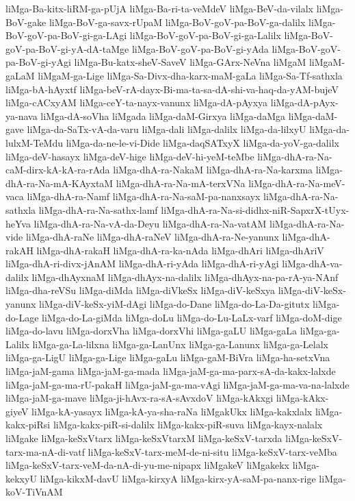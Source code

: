 {liMga-Ba-kitx-liRM-ga-pUjA
liMga-Ba-ri-ta-veMdeV
liMga-BeV-da-vilalx
liMga-BoV-gake
liMga-BoV-ga-savx-rUpaM
liMga-BoV-goV-pa-BoV-ga-dalilx
liMga-BoV-goV-pa-BoV-gi-ga-LAgi
liMga-BoV-goV-pa-BoV-gi-ga-Lalilx
liMga-BoV-goV-pa-BoV-gi-yA-dA-taMge
liMga-BoV-goV-pa-BoV-gi-yAda
liMga-BoV-goV-pa-BoV-gi-yAgi
liMga-Bu-katx-sheV-SaveV
liMga-GArx-NeVna
liMgaM
liMgaM-gaLaM
liMgaM-ga-Lige
liMga-Sa-Divx-dha-karx-maM-gaLa
liMga-Sa-Tf-sathxla
liMga-bA-hAyxtf
liMga-beV-rA-dayx-Bi-ma-ta-sa-dA-shi-va-haq-da-yAM-bujeV
liMga-cACxyAM
liMga-ceY-ta-nayx-vanunx
liMga-dA-pAyxya
liMga-dA-pAyx-ya-nava
liMga-dA-soVha
liMgada
liMga-daM-Girxya
liMga-daMga
liMga-daM-gave
liMga-da-SaTx-vA-da-varu
liMga-dali
liMga-dalilx
liMga-da-lilxyU
liMga-da-lulxM-TeMdu
liMga-da-ne-le-vi-Dide
liMga-daqSATxyX
liMga-da-yoV-ga-dalilx
liMga-deV-hasayx
liMga-deV-hige
liMga-deV-hi-yeM-teMbe
liMga-dhA-ra-Na-caM-dirx-kA-kA-ra-rAda
liMga-dhA-ra-NakaM
liMga-dhA-ra-Na-karxma
liMga-dhA-ra-Na-mA-KAyxtaM
liMga-dhA-ra-Na-mA-terxVNa
liMga-dhA-ra-Na-meV-vaca
liMga-dhA-ra-Namf
liMga-dhA-ra-Na-saM-pa-nanxsayx
liMga-dhA-ra-Na-sathxla
liMga-dhA-ra-Na-sathx-lamf
liMga-dhA-ra-Na-si-didhx-niR-SapxrX-tUyx-heYva
liMga-dhA-ra-Na-vA-da-Deyu
liMga-dhA-ra-Na-vatAM
liMga-dhA-ra-Na-vide
liMga-dhA-raNe
liMga-dhA-raNeV
liMga-dhA-ra-Ne-yanunx
liMga-dhA-rakAH
liMga-dhA-rakaH
liMga-dhA-ra-ka-nAda
liMga-dhAri
liMga-dhAriV
liMga-dhA-ri-divx-jAnAM
liMga-dhA-ri-yAda
liMga-dhA-ri-yAgi
liMga-dhA-va-dalilx
liMga-dhAyxnaM
liMga-dhAyx-na-dalilx
liMga-dhAyx-na-pa-rA-ya-NAnf
liMga-dha-reVSu
liMga-diMda
liMga-diVkeSx
liMga-diV-keSxya
liMga-diV-keSx-yanunx
liMga-diV-keSx-yiM-dAgi
liMga-do-Dane
liMga-do-La-Da-gitutx
liMga-do-Lage
liMga-do-La-giMda
liMga-doLu
liMga-do-Lu-LaLx-varf
liMga-doM-dige
liMga-do-lavu
liMga-dorxVha
liMga-dorxVhi
liMga-gaLU
liMga-gaLa
liMga-ga-Lalilx
liMga-ga-La-lilxna
liMga-ga-LanUnx
liMga-ga-Lanunx
liMga-ga-Lelalx
liMga-ga-LigU
liMga-ga-Lige
liMga-gaLu
liMga-gaM-BiVra
liMga-ha-setxVna
liMga-jaM-gama
liMga-jaM-ga-mada
liMga-jaM-ga-ma-parx-sA-da-kakx-lalxde
liMga-jaM-ga-ma-rU-pakaH
liMga-jaM-ga-ma-vAgi
liMga-jaM-ga-ma-va-na-lalxde
liMga-jaM-ga-mave
liMga-ji-hAvx-ra-sA-sAvxdoV
liMga-kAkxgi
liMga-kAkx-giyeV
liMga-kA-yasayx
liMga-kA-ya-sha-raNa
liMgakUkx
liMga-kakxlalx
liMga-kakx-piRsi
liMga-kakx-piR-si-dalilx
liMga-kakx-piR-suva
liMga-kayx-nalalx
liMgake
liMga-keSxVtarx
liMga-keSxVtarxM
liMga-keSxV-tarxda
liMga-keSxV-tarx-ma-nA-di-vatf
liMga-keSxV-tarx-meM-de-ni-situ
liMga-keSxV-tarx-veMba
liMga-keSxV-tarx-veM-da-nA-di-yu-me-nipapx
liMgakeV
liMgakekx
liMga-kekxyU
liMga-kikxM-davU
liMga-kirxyA
liMga-kirx-yA-saM-pa-nanx-rige
liMga-koV-TiVnAM
}
